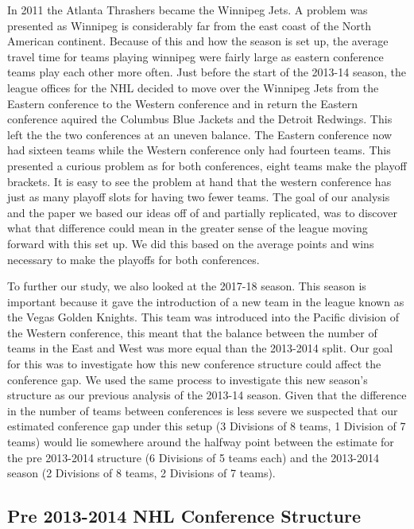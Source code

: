 \documentclass[
]{article}
\begin{document}
In 2011 the Atlanta Thrashers became the Winnipeg Jets. A problem was
presented as Winnipeg is considerably far from the east coast of the
North American continent. Because of this and how the season is set up,
the average travel time for teams playing winnipeg were fairly large as
eastern conference teams play each other more often. Just before the
start of the 2013-14 season, the league offices for the NHL decided to
move over the Winnipeg Jets from the Eastern conference to the Western
conference and in return the Eastern conference aquired the Columbus
Blue Jackets and the Detroit Redwings. This left the the two conferences
at an uneven balance. The Eastern conference now had sixteen teams while
the Western conference only had fourteen teams. This presented a curious
problem as for both conferences, eight teams make the playoff brackets.
It is easy to see the problem at hand that the western conference has
just as many playoff slots for having two fewer teams. The goal of our
analysis and the paper we based our ideas off of and partially
replicated, was to discover what that difference could mean in the
greater sense of the league moving forward with this set up. We did this
based on the average points and wins necessary to make the playoffs for
both conferences.

To further our study, we also looked at the 2017-18 season. This season
is important because it gave the introduction of a new team in the
league known as the Vegas Golden Knights. This team was introduced into
the Pacific division of the Western conference, this meant that the
balance between the number of teams in the East and West was more equal
than the 2013-2014 split. Our goal for this was to investigate how this
new conference structure could affect the conference gap. We used the
same process to investigate this new season's structure as our previous
analysis of the 2013-14 season. Given that the difference in the number
of teams between conferences is less severe we suspected that our
estimated conference gap under this setup (3 Divisions of 8 teams, 1
Division of 7 teams) would lie somewhere around the halfway point
between the estimate for the pre 2013-2014 structure (6 Divisions of 5
teams each) and the 2013-2014 season (2 Divisions of 8 teams, 2
Divisions of 7 teams).

\hypertarget{pre-2013-2014-nhl-conference-structure}{%
\subsection{Pre 2013-2014 NHL Conference
Structure}\label{pre-2013-2014-nhl-conference-structure}}
\end{document}
